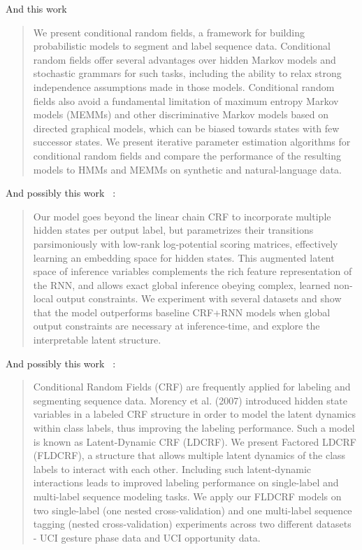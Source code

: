 \documentclass[a4paper, 11pt]{report}
\begin{document}
	And this work ~\cite{lafferty2001}
	
	\begin{quote}
		We present conditional random fields, a framework for building probabilistic models to segment and label
		sequence data. Conditional random fields offer several advantages over hidden Markov models and
		stochastic grammars for such tasks, including the ability to relax strong independence assumptions
		made in those models. Conditional random fields also avoid a fundamental limitation of maximum
		entropy Markov models (MEMMs) and other discriminative Markov models based on directed graphical
		models, which can be biased towards states with few successor states. We present iterative parameter
		estimation algorithms for conditional random fields and compare the performance of the resulting
		models to HMMs and MEMMs on synthetic and natural-language data.
	\end{quote}

	And possibly this work ~\cite{thai2018}:
	
	\begin{quote}
		 Our model goes beyond the linear chain CRF to incorporate multiple hidden states per output label, but parametrizes their transitions parsimoniously with low-rank log-potential scoring matrices, effectively learning an embedding space for hidden states. This augmented latent space of inference variables complements the rich feature representation of the RNN, and allows exact global inference obeying complex, learned non-local output constraints. We experiment with several datasets and show that the model outperforms baseline CRF+RNN models when global output constraints are necessary at inference-time, and explore the interpretable latent structure. 
	\end{quote}

	And possibly this work ~\cite{neogi2019}:
	
	\begin{quote}
		Conditional Random Fields (CRF) are frequently applied for labeling and segmenting sequence data. Morency et al. (2007) introduced hidden state variables in a labeled CRF structure in order to model the latent dynamics within class labels, thus improving the labeling performance. Such a model is known as Latent-Dynamic CRF (LDCRF). We present Factored LDCRF (FLDCRF), a structure that allows multiple latent dynamics of the class labels to interact with each other. Including such latent-dynamic interactions leads to improved labeling performance on single-label and multi-label sequence modeling tasks. We apply our FLDCRF models on two single-label (one nested cross-validation) and one multi-label sequence tagging (nested cross-validation) experiments across two different datasets - UCI gesture phase data and UCI opportunity data.
	\end{quote}
\end{document}

